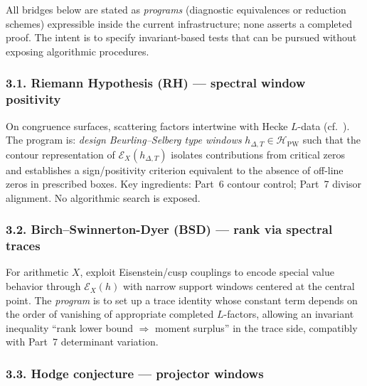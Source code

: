 All bridges below are stated as \emph{programs} (diagnostic equivalences or reduction schemes) expressible inside the current infrastructure; none asserts a completed proof. The intent is to specify invariant-based tests that can be pursued without exposing algorithmic procedures. \relax\hspace{0pt}

\subsubsection*{3.1. Riemann Hypothesis (RH) — spectral window positivity}\relax\hspace{0pt}
\label{subsubsec:tfc8-RH} %

On congruence surfaces, scattering factors intertwine with Hecke $L$-data (cf.\ \cite{IwaniecKowalski,Borthwick}). The program is: \emph{design Beurling–Selberg type windows} $h_{\Delta,T}\in\mathcal{H}_{\mathrm{PW}}$ such that the contour representation of $\mathcal{E}_X(h_{\Delta,T})$ isolates contributions from critical zeros and establishes a sign/positivity criterion equivalent to the absence of off-line zeros in prescribed boxes. \relax\hspace{0pt}
Key ingredients: Part~6 contour control; Part~7 divisor alignment. No algorithmic search is exposed. \relax\hspace{0pt}

\subsubsection*{3.2. Birch--Swinnerton-Dyer (BSD) — rank via spectral traces}\relax\hspace{0pt}
\label{subsubsec:tfc8-BSD} %

For arithmetic $X$, exploit Eisenstein/cusp couplings to encode special value behavior through $\mathcal{E}_X(h)$ with narrow support windows centered at the central point. The \emph{program} is to set up a trace identity whose constant term depends on the order of vanishing of appropriate completed $L$-factors, allowing an invariant inequality ``rank lower bound $\Rightarrow$ moment surplus'' in the trace side, compatibly with Part~7 determinant variation. \relax\hspace{0pt}

\subsubsection*{3.3. Hodge conjecture — projector windows}\relax\hspace{0pt}
\label{subsubsec:tfc8-Hodge} %

